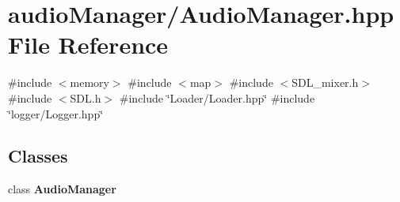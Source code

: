 \section{audio\+Manager/\+Audio\+Manager.hpp File Reference}
\label{_audio_manager_8hpp}
{\ttfamily \#include $<$memory$>$}\newline
{\ttfamily \#include $<$map$>$}\newline
{\ttfamily \#include $<$S\+D\+L\+\_\+mixer.\+h$>$}\newline
{\ttfamily \#include $<$S\+D\+L.\+h$>$}\newline
{\ttfamily \#include \char`\"{}Loader/\+Loader.\+hpp\char`\"{}}\newline
{\ttfamily \#include \char`\"{}logger/\+Logger.\+hpp\char`\"{}}\newline
\subsection*{Classes}
\begin{DoxyCompactItemize}
\item 
class \textbf{ Audio\+Manager}
\end{DoxyCompactItemize}
